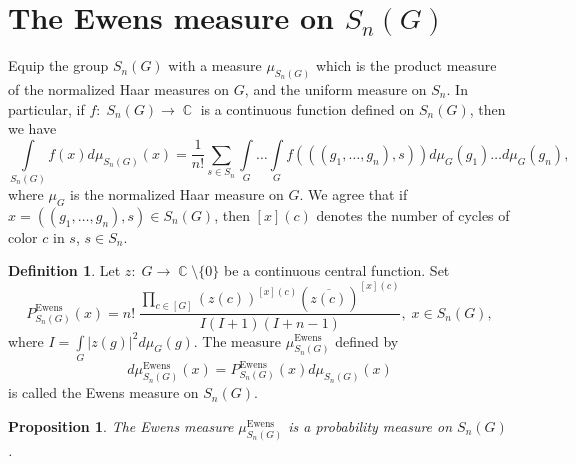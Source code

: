 \documentclass[12pt]{amsart}
\newtheorem{prop}[thm]{Proposition}
\theoremstyle{definition}
\newtheorem{defn}[thm]{Definition}
\numberwithin{equation}{section}
\DeclareMathOperator{\C}{\mathbb{C}}
\DeclareMathOperator{\Ewens}{Ewens}
\begin{document}
\section{The Ewens measure on $S_n\left(G\right)$}\label{SECTIONEWENSMEASURE}
Equip the group $S_n\left(G\right)$ with a measure $\mu_{S_n\left(G\right)}$ which is the product measure
of the normalized Haar measures on $G$, and the uniform measure on $S_n$. In particular, if
$f:\; S_n\left(G\right)\longrightarrow\C$ is  a continuous function defined on $S_n\left(G\right)$, then we have
\begin{equation}
\int\limits_{S_n\left(G\right)}f(x)d\mu_{S_n\left(G\right)}(x)=
\frac{1}{n!}\sum\limits_{s\in S_n}\int\limits_{G}\ldots\int\limits_{G}
f\left(\left(\left(g_1,\ldots,g_n\right),s\right)\right)
d\mu_G\left(g_1\right)\ldots d\mu_G\left(g_n\right),
\end{equation}
where $\mu_G$ is the normalized Haar measure on $G$. We agree that if $x=\left(\left(g_1,\ldots,g_n\right),s\right)\in
S_n\left(G\right)$, then $[x](c)$ denotes the number of cycles of color $c$ in $s$, $s\in S_n$.
\begin{defn}\label{Definition2.1}Let $z:\; G\longrightarrow\C\setminus\{0\}$ be a continuous central function.
Set
\begin{equation}
P_{S_n\left(G\right)}^{\Ewens}(x)=n!\;\frac{\prod\limits_{c\in[G]}\left(z(c)\right)^{[x](c)}\left(\overline{z(c)}\right)^{[x](c)}}{
I(I+1)(I+n-1)
},\; x\in S_n(G),
\end{equation}
where $I=\int\limits_{G}\left|z(g)\right|^2d\mu_{G}(g)$. The measure
$\mu^{\Ewens}_{S_n(G)}$ defined by
\begin{equation}\label{TheRelationBetweenMeasures}
d\mu_{S_n\left(G\right)}^{\Ewens}(x)=P_{S_n\left(G\right)}^{\Ewens}(x)d\mu_{S_n\left(G\right)}(x)
\end{equation}
is called the Ewens measure on $S_n\left(G\right)$.
\end{defn}
\begin{prop}The Ewens measure $\mu_{S_n\left(G\right)}^{\Ewens}$ is a probability measure
on $S_n\left(G\right)$.
\end{prop}
\end{document}
